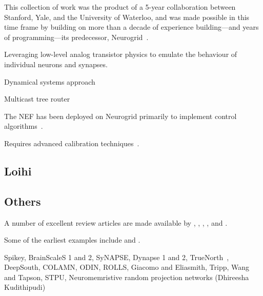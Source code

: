 This collection of work was the product of a 5-year collaboration between Stanford, Yale, and the University of Waterloo, and was made possible in this time frame 
by building on more than a decade of experience building---and years of programming---its predecessor, Neurogrid~\citep{neurogrid2014}. 

Leveraging low-level analog transistor physics to emulate the behaviour of individual neurons and synapses.

Dynamical systems approach \citep{arthur2011silicon}

Multicast tree router \citep{merolla2014multicast}

The NEF has been deployed on Neurogrid primarily to implement control algorithms~\citep{dethier2011brain, choudhary2012silicon, menon2014controlling}.

Requires advanced calibration techniques~\citep{kauderer2017calibrating}.

\subsection{Loihi}

\citep{blouw2018a}

\subsection{Others}
\label{sec:neuromorphic-others}

A number of excellent review articles are made available by \citet{bartolozzi1999neuromorphic}, \citet{indiveri2011neuromorphic}, \citet{cassidy2013design}, \citet{eryilmaz2016neuromorphic}, and \citet{cummings2018}.

Some of the earliest examples include \citep{sivilotti1985novel, boahen1989heteroassociative} and \citep{mead1988silicon}.

Spikey, BrainScaleS 1 and 2, SyNAPSE, Dynapse 1 and 2, TrueNorth~\citep{merolla2014million, fischl2018}, DeepSouth, COLAMN, ODIN, ROLLS, Giacomo and Eliasmith, Tripp, Wang and Tapson, STPU, Neuromemristive random projection networks (Dhireesha Kudithipudi)

